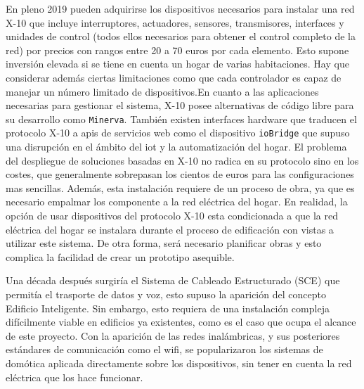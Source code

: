 \vspace{1cm}

En pleno 2019 pueden adquirirse los dispositivos necesarios para instalar una red X-10 que incluye interruptores, actuadores, sensores, transmisores, interfaces y unidades de control (todos ellos necesarios para obtener el control completo de la red) por precios con rangos entre 20 a 70 euros por cada elemento. Esto supone inversión elevada si se tiene en cuenta un hogar de varias habitaciones. Hay que considerar además ciertas limitaciones como que cada controlador es capaz de manejar un número limitado de dispositivos.En cuanto a las aplicaciones necesarias para gestionar el sistema, X-10 posee alternativas de código libre para su desarrollo como \verb|Minerva|. También existen interfaces hardware que traducen el protocolo X-10 a \gls{api}s de servicios web como el dispositivo \verb|ioBridge| que supuso una disrupción en el ámbito del \gls{iot} y la automatización del hogar. El problema del despliegue de soluciones basadas en X-10 no radica en su protocolo sino en los costes, que generalmente sobrepasan los cientos de euros para las configuraciones mas sencillas. Además, esta instalación requiere de un proceso de obra, ya que es necesario empalmar los componente a la red eléctrica del hogar. En realidad, la opción de usar dispositivos del protocolo X-10 esta condicionada a que la red eléctrica del hogar se instalara durante el proceso de edificación con vistas a utilizar este sistema. De otra forma, será necesario planificar obras y esto complica la facilidad de crear un prototipo asequible.

\vspace{1cm}

Una década después surgiría el Sistema de Cableado Estructurado (SCE) que permitía el trasporte de datos y voz, esto supuso la aparición del concepto Edificio Inteligente. Sin embargo, esto requiera de una instalación compleja difícilmente viable en edificios ya existentes, como es el caso que ocupa el alcance de este proyecto. Con la aparición de las redes inalámbricas, y sus posteriores estándares de comunicación como el \gls{wifi}, se popularizaron los sistemas de domótica aplicada directamente sobre los dispositivos, sin tener en cuenta la red eléctrica que los hace funcionar. 

\vspace{1cm}

